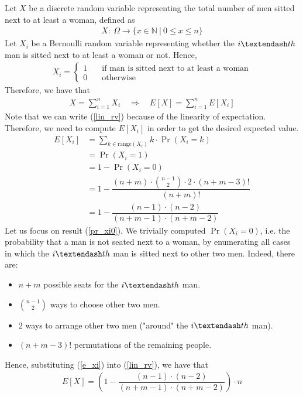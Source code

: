 Let $X$ be a discrete random variable representing the total number of men sitted next to at least a woman, defined as
\begin{align*}
	X: \ \Omega \longrightarrow \{ x \in \mathbb{N} \ | \ 0 \leq x \leq n \}
\end{align*}
Let $X_i$ be a Bernoulli random variable representing whether the $i \textendash th$ man is sitted next to at least a woman or not. Hence,
\begin{align*}
	X_i = 
	\left\{ \begin{aligned}
		1 &\quad\text{if man is sitted next to at least a woman}\\
		0 &\quad\text{otherwise}
	\end{aligned}\right.
\end{align*}
Therefore, we have that
\begin{align}
	X = \sum_{i = 1}^{n}X_i \quad\Rightarrow\quad E\left[ X \right] = \sum_{i = 1}^{n} E\left[ X_i \right] \label{lin_rv}
\end{align}
Note that we can write (\ref{lin_rv}) because of the linearity of expectation.\\
Therefore, we need to compute $E\left[ X_i \right]$ in order to get the desired expected value.
\begin{align}
	E\left[ X_i \right] &= \sum_{k \in \mathrm{range}(X_i)} k \cdot \Pr(X_i = k)\nonumber\\
	&= \Pr(X_i = 1)\nonumber\\
	&= 1 - \Pr(X_i = 0)\nonumber\\
	&= 1 - \dfrac{(n+m) \cdot \binom{n-1}{2} \cdot 2 \cdot (n+m-3)!}{(n+m)!} \label{pr_xi0}\\
	&= 1 - \dfrac{(n-1) \cdot (n-2)}{(n+m-1) \cdot (n+m-2)} \label{e_xi}
\end{align}
Let us focus on result (\ref{pr_xi0}). We trivially computed $\Pr(X_i = 0)$, i.e. the probability that a man is not seated next to a woman, by enumerating all cases in which the $i \textendash th$ man is sitted next to other two men. Indeed, there are:
\begin{itemize}
	\item $n+m$ possible seats for the $i \textendash th$ man.
	\item $\binom{n-1}{2}$ ways to choose other two men.
	\item 2 ways to arrange other two men ("around" the $i \textendash th$ man).
	\item $(n+m-3)!$ permutations of the remaining people.
\end{itemize}
Hence, substituting (\ref{e_xi}) into (\ref{lin_rv}), we have that
\begin{align}
	E\left[ X \right] = \left( 1 - \dfrac{(n-1) \cdot (n-2)}{(n+m-1) \cdot (n+m-2)} \right) \cdot n
\end{align}














